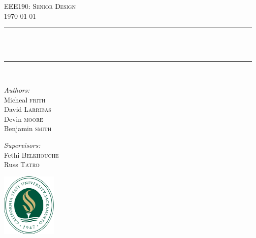 \begin{titlepage}
	\begin{center}
	\vspace{20 cm}
	
	\textsc{\LARGE EEE190: Senior Design}\\[1.3cm]
	
	\textsc{\Large \today}\\[0.5cm]
	
	\vspace{5 mm}
	
	\rule{415pt}{2pt}\\
	{ \huge \bfseries \TITLE \\[0.2cm] }
	\rule{415pt}{2pt}\\
	
	\vspace{10mm}
	
	\begin{minipage}{0.4\textwidth}
	\begin{flushleft} \large
	
	\emph{Authors:}\\
	Micheal 	\textsc{frith}\\
	David 	\textsc{Larribas}\\
	Devin 	\textsc{moore}\\
	Benjamin \textsc{smith}\\
	\end{flushleft}
	\end{minipage}
	\begin{minipage}{0.4\textwidth}
	\begin{flushright} \large
	
	\emph{Supervisors:} \\
	Fethi 	\textsc{Belkhouche} \\
	Russ	\textsc{Tatro}
	\end{flushright}
	\end{minipage}
	
	\vfill
	
	\includegraphics[width=0.2\textwidth]{./logo}~\\[1cm]
		
	\end{center}
\end{titlepage}